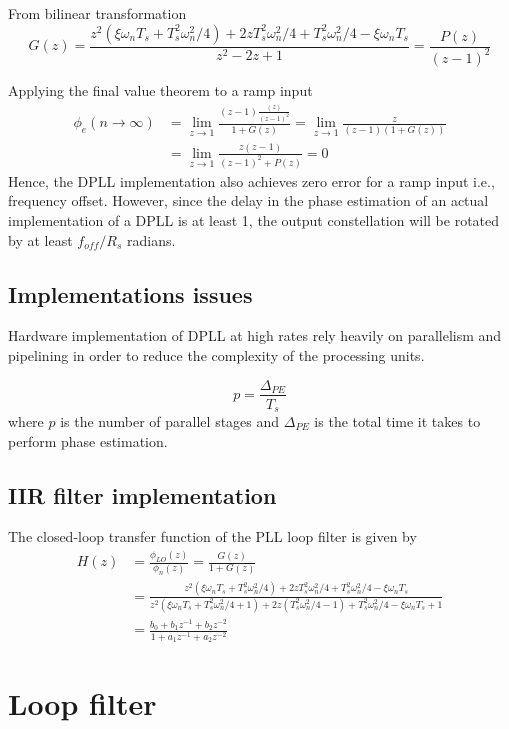 \documentclass[a4paper]{article}
\begin{document}
From bilinear transformation
\begin{equation}
G(z) = \frac{z^2(\xi\omega_nT_s + T_s^2\omega_n^2/4) + 2zT_s^2\omega_n^2/4 + T_s^2\omega_n^2/4 - \xi\omega_nT_s}{z^2 - 2z + 1} = \frac{P(z)}{(z-1)^2}
\end{equation}

Applying the final value theorem to a ramp input
\begin{align} \nonumber
\phi_e(n\to\infty) &= \lim_{z\to 1} \frac{(z-1)\frac{(z)}{(z-1)^2}}{1 + G(z)} = \lim_{z\to 1} \frac{z}{(z-1)(1 + G(z))} \\
&= \lim_{z\to 1} \frac{z(z-1)}{(z-1)^2 + P(z)} = 0
\end{align}
Hence, the DPLL implementation also achieves zero error for a ramp input i.e., frequency offset. However, since the delay in the phase estimation of an actual implementation of a DPLL is at least 1, the output constellation will be rotated by at least $f_{off}/R_s$ radians.

\subsection{Implementations issues}
Hardware implementation of DPLL at high rates rely heavily on parallelism and pipelining in order to reduce the complexity of the processing units. 

\begin{equation}
p = \frac{\Delta_{PE}}{T_s}
\end{equation}
where $p$ is the number of parallel stages and $\Delta_{PE}$ is the total time it takes to perform phase estimation.

\subsection{IIR filter implementation}
The closed-loop transfer function of the PLL loop filter is given by
\begin{align} \nonumber
H(z) &= \frac{\phi_{LO}(z)}{\phi_n(z)} = \frac{G(z)}{1 + G(z)} \\ \nonumber
&= \frac{z^2(\xi\omega_nT_s + T_s^2\omega_n^2/4) + 2zT_s^2\omega_n^2/4 + T_s^2\omega_n^2/4 - \xi\omega_nT_s}{z^2(\xi\omega_nT_s + T_s^2\omega_n^2/4 + 1) + 2z(T_s^2\omega_n^2/4-1) + T_s^2\omega_n^2/4 - \xi\omega_nT_s + 1} \\
& = \frac{b_0 + b_1z^{-1} + b_2z^{-2}}{1 + a_1z^{-1} + a_2z^{-2}}
\end{align}

\section{Loop filter}
\end{document}
